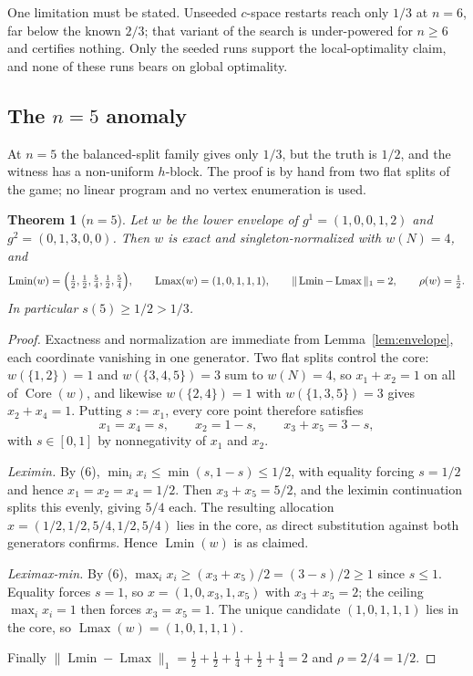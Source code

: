 \documentclass[11pt]{article}
\newtheorem{theorem}{Theorem}
\newcommand{\core}{\operatorname{Core}}
\newcommand{\Lmin}{\operatorname{Lmin}}
\newcommand{\Lmax}{\operatorname{Lmax}}
\begin{document}
One limitation must be stated.  Unseeded $c$-space restarts reach only $1/3$
at $n=6$, far below the known $2/3$; that variant of the search is
under-powered for $n\ge6$ and certifies nothing.  Only the seeded runs
support the local-optimality claim, and none of these runs bears on global
optimality.

\subsection{The \texorpdfstring{$n=5$}{n=5} anomaly}\label{sec:n5}

At $n=5$ the balanced-split family gives only $1/3$, but the truth is $1/2$,
and the witness has a non-uniform $h$-block.  The proof is by hand from two
flat splits of the game; no linear program and no vertex enumeration is
used.

\begin{theorem}[$n=5$]\label{thm:n5}
Let $w$ be the lower envelope of $g^1=(1,0,0,1,2)$ and $g^2=(0,1,3,0,0)$.
Then $w$ is exact and singleton-normalized with $w(N)=4$, and
\[
 \Lmin(w)=\Bigl(\tfrac12,\tfrac12,\tfrac54,\tfrac12,\tfrac54\Bigr),\qquad
 \Lmax(w)=(1,0,1,1,1),\qquad
 \|\Lmin-\Lmax\|_1=2,\qquad \rho(w)=\tfrac12 .
\]
In particular $s(5)\ge1/2>1/3$.
\end{theorem}

\begin{proof}
Exactness and normalization are immediate from Lemma~\ref{lem:envelope}, each
coordinate vanishing in one generator.  Two flat splits control the core:
$w(\{1,2\})=1$ and $w(\{3,4,5\})=3$ sum to $w(N)=4$, so $x_1+x_2=1$ on
all of $\core(w)$, and likewise $w(\{2,4\})=1$ with $w(\{1,3,5\})=3$
gives $x_2+x_4=1$.  Putting $s:=x_1$, every core point therefore satisfies
\[
 x_1=x_4=s,\qquad x_2=1-s,\qquad x_3+x_5=3-s, \tag{6}
\]
with $s\in[0,1]$ by nonnegativity of $x_1$ and $x_2$.

\emph{Leximin.}  By (6), $\min_ix_i\le\min(s,1-s)\le1/2$, with equality
forcing $s=1/2$ and hence $x_1=x_2=x_4=1/2$.  Then $x_3+x_5=5/2$, and the
leximin continuation splits this evenly, giving $5/4$ each.  The resulting
allocation $x=(1/2,1/2,5/4,1/2,5/4)$ lies in the core, as direct
substitution against both generators confirms.  Hence $\Lmin(w)$ is as
claimed.

\emph{Leximax-min.}  By (6), $\max_ix_i\ge(x_3+x_5)/2=(3-s)/2\ge1$ since
$s\le1$.  Equality forces $s=1$, so $x=(1,0,x_3,1,x_5)$ with $x_3+x_5=2$; the ceiling
$\max_ix_i=1$ then forces $x_3=x_5=1$.  The unique candidate $(1,0,1,1,1)$
lies in the core, so $\Lmax(w)=(1,0,1,1,1)$.

Finally $\|\Lmin-\Lmax\|_1=\tfrac12+\tfrac12+\tfrac14+\tfrac12+\tfrac14=2$
and $\rho=2/4=1/2$.
\end{proof}
\end{document}
